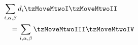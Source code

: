 \documentclass[border=3pt]{standalone}
\begin{document}
$\displaystyle
\begin{aligned}
&\sum_{i,\alpha,\beta}d_{i}\tzMoveMtwoI \tzMoveMtwoII\\ 
		&\quad= \sum_{i,\alpha,\beta} \tzMoveMtwoIII \tzMoveMtwoIV
\end{aligned}
$
\end{document}
